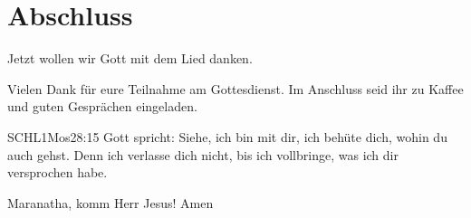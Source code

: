 \documentclass{mybib}
\begin{document}




\section{Abschluss}

Jetzt wollen wir Gott mit dem Lied  danken.

Vielen Dank für eure Teilnahme am Gottesdienst. Im Anschluss seid ihr zu Kaffee und guten Gesprächen eingeladen.
\beten{}

\begin{bibelbox}{SCHL}{1Mos}{28:15}
Gott spricht: Siehe, ich bin mit dir,
ich behüte dich, wohin du auch gehst.
Denn ich verlasse dich nicht,
bis ich vollbringe, was ich dir versprochen habe.
\end{bibelbox}

Maranatha, komm Herr Jesus! Amen
\end{document}
